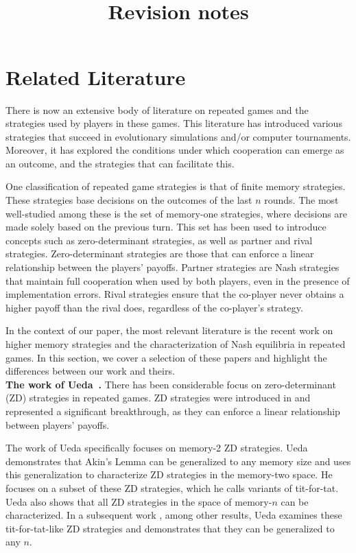 \documentclass[11pt]{article}
\title{~\\[-1.5cm]{\sffamily \Large Revision notes}\\[-0.3cm]}
\date{\empty}
\theoremstyle{plainCl1}
\theoremstyle{plainCl2}
\begin{document}
\section{Related Literature}

There is now an extensive body of literature on repeated games and the
strategies used by players in these games. This literature has introduced
various strategies that succeed in evolutionary simulations and/or computer
tournaments. Moreover, it has explored the conditions under which cooperation
can emerge as an outcome, and the strategies that can facilitate this.

One classification of repeated game strategies is that of finite memory
strategies. These strategies base decisions on the outcomes of the last \(n\)
rounds. The most well-studied among these is the set of memory-one strategies,
where decisions are made solely based on the previous turn. This set has
been used to introduce concepts such as zero-determinant strategies, as well as
partner and rival strategies. Zero-determinant strategies are those that can
enforce a linear relationship between the players' payoffs. Partner strategies
are Nash strategies that maintain full cooperation when used by both players,
even in the presence of implementation errors. Rival strategies ensure that the
co-player never obtains a higher payoff than the rival does, regardless of the
co-player's strategy.

In the context of our paper, the most relevant literature is the recent work on
higher memory strategies and the characterization of Nash equilibria in repeated
games. In this section, we cover a selection of these papers and highlight the
differences between our work and theirs. \\

\noindent
{\bf The work of Ueda~\cite{ueda:RSOP:2021, Ueda:ORF:2022}.}
There has been considerable focus on zero-determinant (ZD) strategies in
repeated games. ZD strategies were introduced in \cite{press:PNAS:2012} and
represented a significant breakthrough, as they can enforce a linear
relationship between players' payoffs.

The work of Ueda \cite{ueda:RSOP:2021} specifically focuses on memory-2
ZD strategies. Ueda demonstrates that Akin's Lemma \cite{akin:EGADS:2016} can be
generalized to any memory size and uses this generalization to characterize ZD
strategies in the memory-two space. He focuses on a subset of these ZD
strategies, which he calls variants of tit-for-tat. Ueda also shows that all ZD
strategies in the space of memory-\(n\) can be characterized. In a subsequent
work \cite{Ueda:ORF:2022}, among other results, Ueda examines these
tit-for-tat-like ZD strategies and demonstrates that they can be generalized to
any \(n\).
\end{document}
